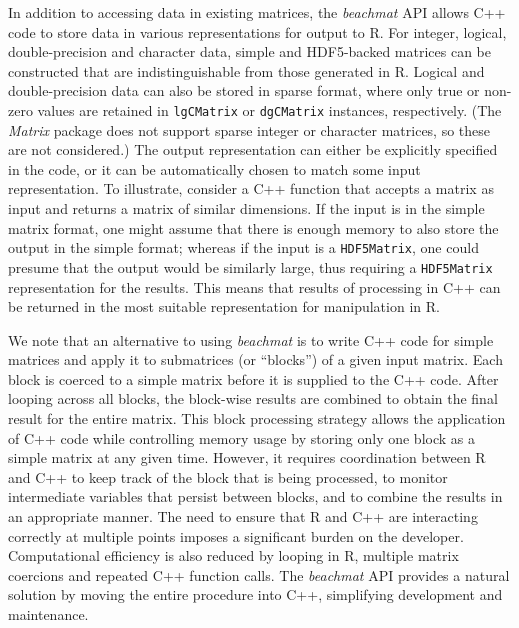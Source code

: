 \documentclass[10pt,letterpaper]{article}
\newcommand{\suppseclayoutoptim}{2}
\newcommand{\beachmat}{\textit{beachmat}}
\newcommand{\code}[1]{\texttt{#1}}
\begin{document}
In addition to accessing data in existing matrices, the \beachmat{} API allows C++ code to store data in various representations for output to R.
For integer, logical, double-precision and character data, simple and HDF5-backed matrices can be constructed that are indistinguishable from those generated in R.
Logical and double-precision data can also be stored in sparse format, where only true or non-zero values are retained in \code{lgCMatrix} or \code{dgCMatrix} instances, respectively.
(The \textit{Matrix} package does not support sparse integer or character matrices, so these are not considered.)
The output representation can either be explicitly specified in the code, or it can be automatically chosen to match some input representation.
To illustrate, consider a C++ function that accepts a matrix as input and returns a matrix of similar dimensions.
If the input is in the simple matrix format, one might assume that there is enough memory to also store the output in the simple format;
whereas if the input is a \code{HDF5Matrix}, one could presume that the output would be similarly large, thus requiring a \code{HDF5Matrix} representation for the results.
This means that results of processing in C++ can be returned in the most suitable representation for manipulation in R.
 

We note that an alternative to using \beachmat{} is to write C++ code for simple matrices and apply it to submatrices (or ``blocks'') of a given input matrix.
Each block is coerced to a simple matrix before it is supplied to the C++ code.
After looping across all blocks, the block-wise results are combined to obtain the final result for the entire matrix.
This block processing strategy allows the application of C++ code while controlling memory usage by storing only one block as a simple matrix at any given time.
However, it requires coordination between R and C++ to keep track of the block that is being processed, to monitor intermediate variables that persist between blocks, and to combine the results in an appropriate manner.
The need to ensure that R and C++ are interacting correctly at multiple points imposes a significant burden on the developer.
Computational efficiency is also reduced by looping in R, multiple matrix coercions and repeated C++ function calls.
The \beachmat{} API provides a natural solution by moving the entire procedure into C++, simplifying development and maintenance.
\end{document}
